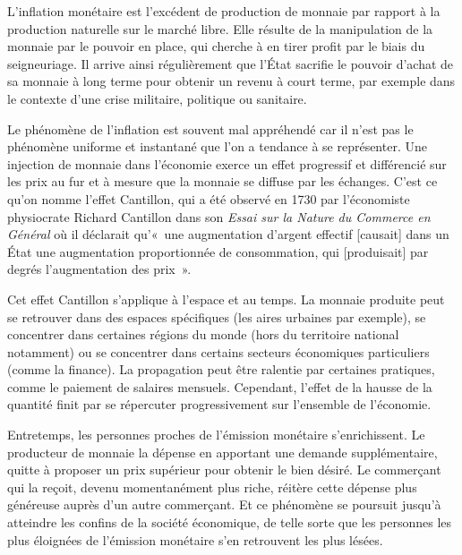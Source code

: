 L'inflation monétaire est l'excédent de production de monnaie par rapport à la production naturelle sur le marché libre. Elle résulte de la manipulation de la monnaie par le pouvoir en place, qui cherche à en tirer profit par le biais du seigneuriage. Il arrive ainsi régulièrement que l'État sacrifie le pouvoir d'achat de sa monnaie à long terme pour obtenir un revenu à court terme, par exemple dans le contexte d'une crise militaire, politique ou sanitaire.


Le phénomène de l'inflation est souvent mal appréhendé car il n'est pas le phénomène uniforme et instantané que l'on a tendance à se représenter. Une injection de monnaie dans l'économie exerce un effet progressif et différencié sur les prix au fur et à mesure que la monnaie se diffuse par les échanges. C'est ce qu'on nomme l'effet Cantillon, qui a été observé en 1730 par l'économiste physiocrate Richard Cantillon dans son \emph{Essai sur la Nature du Commerce en Général} où il déclarait qu'«~une augmentation d'argent effectif [causait] dans un État une augmentation proportionnée de consommation, qui [produisait] par degrés l'augmentation des prix~». %

Cet effet Cantillon s'applique à l'espace et au temps. La monnaie produite peut se retrouver dans des espaces spécifiques (les aires urbaines par exemple), se concentrer dans certaines régions du monde (hors du territoire national notamment) ou se concentrer dans certains secteurs économiques particuliers (comme la finance). La propagation peut être ralentie par certaines pratiques, comme le paiement de salaires mensuels. Cependant, l'effet de la hausse de la quantité finit par se répercuter progressivement sur l'ensemble de l'économie.

Entretemps, les personnes proches de l'émission monétaire s'enrichissent. Le producteur de monnaie la dépense en apportant une demande supplémentaire, quitte à proposer un prix supérieur pour obtenir le bien désiré. Le commerçant qui la reçoit, devenu momentanément plus riche, réitère cette dépense plus généreuse auprès d'un autre commerçant. Et ce phénomène se poursuit jusqu'à atteindre les confins de la société économique, de telle sorte que les personnes les plus éloignées de l'émission monétaire s'en retrouvent les plus lésées.

